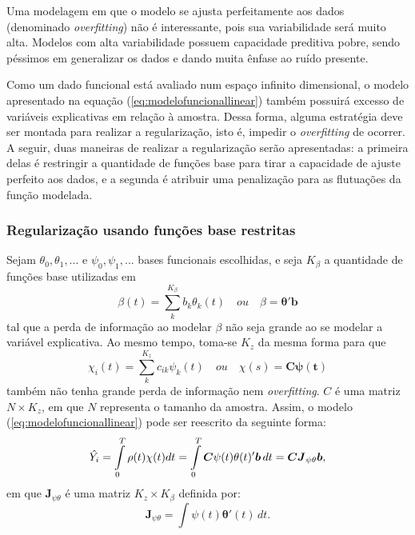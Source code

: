 \documentclass[
	12pt,				%
	openright,			%
	oneside,			%
	a4paper,			%
	english,			%
	brazil				%
	]{dissertacao-ufrgs-abntex2}
\begin{document}
Uma modelagem em que o modelo se ajusta perfeitamente aos dados (denominado
\emph{overfitting}) não é interessante, pois sua variabilidade será
muito alta. Modelos com alta variabilidade possuem capacidade preditiva
pobre, sendo péssimos em generalizar os dados e dando muita ênfase
ao ruído presente. 

Como um dado funcional está avaliado num espaço infinito dimensional,
o modelo apresentado na equação (\ref{eq:modelofuncionallinear})
também possuirá excesso de variáveis explicativas em relação à amostra.
Dessa forma, alguma estratégia deve ser montada para realizar a regularização,
isto é, impedir o \emph{overfitting} de ocorrer. A seguir, duas maneiras
de realizar a regularização serão apresentadas: a primeira delas é
restringir a quantidade de funções base para tirar a capacidade de
ajuste perfeito aos dados, e a segunda é atribuir uma penalização
para as flutuações da função modelada.


\subsubsection*{Regularização usando funções base restritas}

Sejam $\theta_{0},\theta_{1},...$ e $\psi_{0},\psi_{1},...$ bases
funcionais escolhidas, %
e seja $K_{\beta}$ a quantidade de funções base utilizadas em
\begin{equation}
\beta(t)=\sum_{k}^{K_{\beta}}b_{k}\theta_{k}(t)\quad ou\quad\beta=\boldsymbol{\theta'b}
\end{equation}
tal que a perda de informação ao modelar $\beta$ não seja grande
ao se modelar a variável explicativa. Ao mesmo tempo, toma-se $K_{z}$
da mesma forma para que
\begin{equation}
\chi_{i}(t)=\sum_{k}^{K_{z}}c_{ik}\psi_{k}(t)\quad ou\quad\chi(s)=\boldsymbol{C\psi(t)}
\end{equation}
também não tenha grande perda de informação nem \emph{overfitting}.
$C$ é uma matriz $N \times K_{z}$, em que $N$ representa o tamanho da amostra. Assim, o
modelo (\ref{eq:modelofuncionallinear}) pode ser reescrito da seguinte
forma:
\begin{equation}
\hat{Y_{i}}=\intop_{0}^{T}\rho(t)\chi(t)dt=\intop_{0}^{T}\boldsymbol{C}\psi(t)\theta(t)'\boldsymbol{b}\, dt=\boldsymbol{C}\boldsymbol{J}_{\psi\theta}\boldsymbol{b},
\end{equation}
em que $\boldsymbol{J}_{\psi\theta}$ é uma matriz $K_{z} \times K_{\beta}$
definida por:
\begin{equation}
\boldsymbol{J}_{\psi\theta}=\int\psi(t)\boldsymbol{\theta}'(t)\, dt.
\end{equation}
\end{document}
